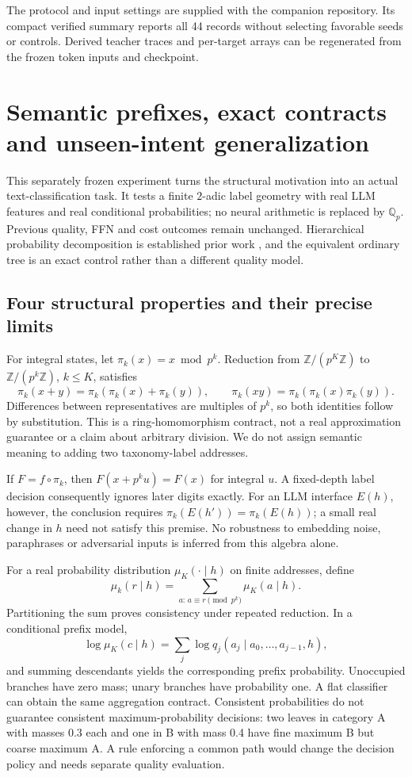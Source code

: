 \documentclass[11pt]{article}
\newcommand{\Z}{\mathbb{Z}}
\newcommand{\Qp}{\mathbb{Q}_p}
\begin{document}
The protocol and input settings are supplied with the companion repository.
Its compact verified summary reports all 44 records without selecting
favorable seeds or controls. Derived teacher traces and per-target arrays
can be regenerated from the frozen token inputs and checkpoint.

\clearpage
\section{Semantic prefixes, exact contracts and unseen-intent generalization}
\label{app:semantic-structure}

This separately frozen experiment turns the structural motivation into an
actual text-classification task. It tests a finite \(2\)-adic label geometry
with real LLM features and real conditional probabilities; no neural
arithmetic is replaced by \(\Qp\). Previous quality, FFN and cost outcomes
remain unchanged. Hierarchical probability decomposition is established
prior work \citep{morin2005hierarchical}, and the equivalent ordinary tree
is an exact control rather than a different quality model.

\subsection{Four structural properties and their precise limits}

For integral states, let \(\pi_k(x)=x\bmod p^k\). Reduction from
\(\Z/(p^K\Z)\) to \(\Z/(p^k\Z)\), \(k\leq K\), satisfies
\[
 \pi_k(x+y)=\pi_k(\pi_k(x)+\pi_k(y)),\qquad
 \pi_k(xy)=\pi_k(\pi_k(x)\pi_k(y)).
\]
Differences between representatives are multiples of \(p^k\), so both
identities follow by substitution. This is a ring-homomorphism contract,
not a real approximation guarantee or a claim about arbitrary division.
We do not assign semantic meaning to adding two taxonomy-label addresses.

If \(F=f\circ\pi_k\), then \(F(x+p^k u)=F(x)\) for integral \(u\).
A fixed-depth label decision consequently ignores later digits exactly.
For an LLM interface \(E(h)\), however, the conclusion requires
\(\pi_k(E(h'))=\pi_k(E(h))\); a small real change in \(h\) need not satisfy
this premise. No robustness to embedding noise, paraphrases or adversarial
inputs is inferred from this algebra alone.

For a real probability distribution \(\mu_K(\cdot\mid h)\) on finite
addresses, define
\[
 \mu_k(r\mid h)=\sum_{a:\,a\equiv r\pmod{p^k}}\mu_K(a\mid h).
\]
Partitioning the sum proves consistency under repeated reduction. In a
conditional prefix model,
\[
 \log\mu_K(c\mid h)=\sum_j\log q_j(a_j\mid a_0,\ldots,a_{j-1},h),
\]
and summing descendants yields the corresponding prefix probability.
Unoccupied branches have zero mass; unary branches have probability one.
A flat classifier can obtain the same aggregation contract. Consistent
probabilities do not guarantee consistent maximum-probability decisions:
two leaves in category A with masses 0.3 each and one in B with mass 0.4
have fine maximum B but coarse maximum A. A rule enforcing a common path
would change the decision policy and needs separate quality evaluation.
\end{document}
